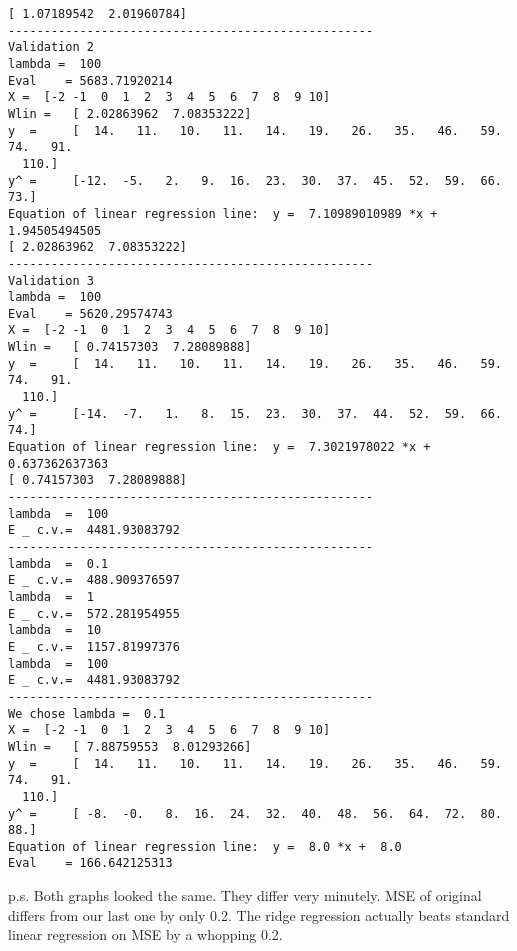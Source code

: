 \documentclass{article}
\begin{document}
\begin{lstlisting}[breaklines=true,basicstyle=\small]
[ 1.07189542  2.01960784]
---------------------------------------------------
Validation 2
lambda =  100
Eval	= 5683.71920214
X =	 [-2 -1  0  1  2  3  4  5  6  7  8  9 10]
Wlin =	 [ 2.02863962  7.08353222]
y  =	 [  14.   11.   10.   11.   14.   19.   26.   35.   46.   59.   74.   91.
  110.]
y^ =	 [-12.  -5.   2.   9.  16.  23.  30.  37.  45.  52.  59.  66.  73.]
Equation of linear regression line:  y =  7.10989010989 *x +  1.94505494505
[ 2.02863962  7.08353222]
---------------------------------------------------
Validation 3
lambda =  100
Eval	= 5620.29574743
X =	 [-2 -1  0  1  2  3  4  5  6  7  8  9 10]
Wlin =	 [ 0.74157303  7.28089888]
y  =	 [  14.   11.   10.   11.   14.   19.   26.   35.   46.   59.   74.   91.
  110.]
y^ =	 [-14.  -7.   1.   8.  15.  23.  30.  37.  44.  52.  59.  66.  74.]
Equation of linear regression line:  y =  7.3021978022 *x +  0.637362637363
[ 0.74157303  7.28089888]
---------------------------------------------------
lambda  =  100
E _ c.v.=  4481.93083792
---------------------------------------------------
lambda  =  0.1
E _ c.v.=  488.909376597
lambda  =  1
E _ c.v.=  572.281954955
lambda  =  10
E _ c.v.=  1157.81997376
lambda  =  100
E _ c.v.=  4481.93083792
---------------------------------------------------
We chose lambda =  0.1
X =	 [-2 -1  0  1  2  3  4  5  6  7  8  9 10]
Wlin =	 [ 7.88759553  8.01293266]
y  =	 [  14.   11.   10.   11.   14.   19.   26.   35.   46.   59.   74.   91.
  110.]
y^ =	 [ -8.  -0.   8.  16.  24.  32.  40.  48.  56.  64.  72.  80.  88.]
Equation of linear regression line:  y =  8.0 *x +  8.0
Eval	= 166.642125313
\end{lstlisting}

p.s. Both graphs looked the same. They differ very minutely.
MSE of original differs from our last one by only 0.2. The ridge regression actually beats standard linear regression on MSE by a whopping 0.2.

\newpage


\end{document}
